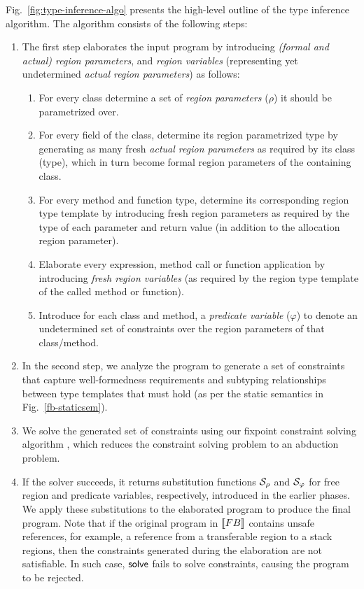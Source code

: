 Fig.~\ref{fig:type-inference-algo} presents the high-level outline of the type
inference algorithm.
The algorithm consists of the following steps:
\begin{enumerate}
 \item The first step elaborates the input program by introducing \emph{(formal and actual) region parameters},
and \emph{region variables} (representing yet undetermined \emph{actual region parameters})
as follows:
\begin{enumerate}
\item For every class determine a set of \emph{region parameters} ($\rho$)
       it should be parametrized over.
\item For every field of the class, determine its region parametrized type by
       generating as many fresh \emph{actual region parameters} as required by its class (type),
       which in turn become formal region parameters of the containing class.
\item  For every method and function type, determine its corresponding region
   type template by introducing fresh region parameters as required by
   the type of each parameter and return value (in addition to the allocation region
   parameter).
 \item Elaborate every  expression, method call or function application by
   introducing \emph{fresh region variables} (as required by the region type
   template of the called method or function).
\item Introduce for each class and method, a \emph{predicate variable} ($\varphi$) to denote
   an undetermined set of constraints over the region parameters of that
   class/method.
\end{enumerate}
 \item In the second step, we analyze the program to generate a set of constraints that capture
   well-formedness requirements and subtyping relationships between type templates
   that must hold (as per the static semantics in Fig.~\ref{fb-staticsem}).
 \item We solve the generated set of constraints using our fixpoint constraint
   solving algorithm \csolvestar, which reduces the constraint solving problem to
   an abduction problem. 
 \item If the solver succeeds, it returns substitution functions $\mathcal{S}_\rho$ and
  $\mathcal{S}_\varphi$ for free region and predicate variables, respectively, introduced in the earlier
phases. We apply these substitutions to the elaborated program to produce the final program.
Note that if the original program in $\llbracket {\sc FB} \rrbracket$ contains unsafe
references, for example, a reference from a transferable region to a
stack regions, then the constraints generated during the elaboration
are not satisfiable. In such case, ${\sf solve}$ fails to solve
constraints, causing the program to be rejected.
\end{enumerate}



